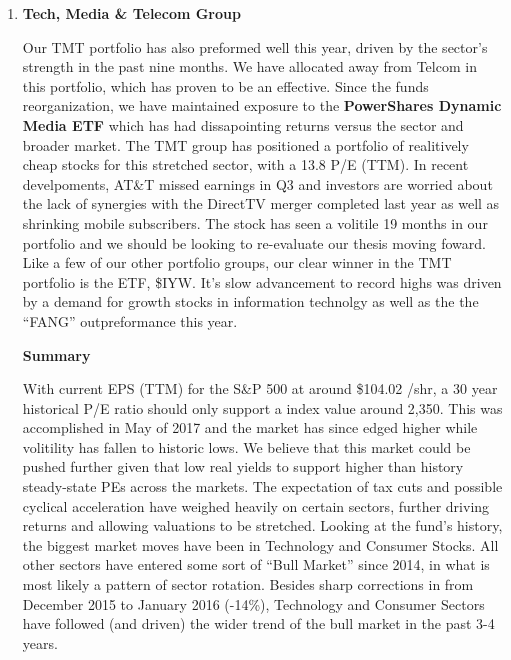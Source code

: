\documentclass[11pt,pressrelease]{newlfm} %
\begin{document}
\begin{newlfm}
\begin{singlespace}
\begin{enumerate}
\item \textbf{Tech, Media \& Telecom Group} \par
Our TMT portfolio has also preformed well this year, driven by the sector's strength in the past nine months. We have allocated away from Telcom in this portfolio, which has proven to be an effective. Since the funds reorganization, we have maintained exposure to the \textbf{PowerShares Dynamic Media ETF} which has had dissapointing returns versus the sector and broader market. The TMT group has positioned a portfolio of realitively cheap stocks for this stretched sector, with a 13.8 P/E (TTM). In recent develpoments, AT\&T missed earnings in Q3 and investors are worried about the lack of synergies with the DirectTV merger completed last year as well as shrinking mobile subscribers. The stock has seen a volitile 19 months in our portfolio and we should be looking to re-evaluate our thesis moving foward. Like a few of our other portfolio groups, our clear winner in the TMT portfolio is the ETF, \$IYW. It's slow advancement to record highs was driven by a demand for growth stocks in information technolgy as well as the the ``FANG'' outpreformance this year.


\center \textbf{Summary} \par
\raggedright
With current EPS (TTM) for the S\&P 500 at around \$104.02 /shr, a 30 year historical P/E ratio should only support a index value around 2,350. This was accomplished in May of 2017 and the market has since edged higher while volitility has fallen to historic lows. We believe that this market could be pushed further given that low real yields to support higher than history steady-state PEs across the markets. The expectation of tax cuts and possible cyclical acceleration have weighed heavily on certain sectors, further driving returns and allowing valuations to be stretched. Looking at the fund's history, the biggest market moves have been in Technology and Consumer Stocks. All other sectors have entered some sort of ``Bull Market'' since 2014, in what is most likely a pattern of sector rotation. Besides sharp corrections in from December 2015 to January 2016 (-14\%), Technology and Consumer Sectors have followed (and driven) the wider trend of the bull market in the past 3-4 years. %


\end{enumerate}
\end{singlespace}
\end{newlfm}
\end{document}
